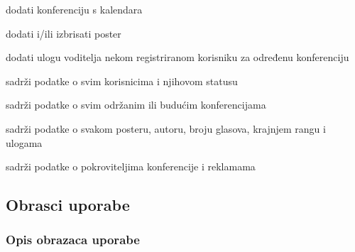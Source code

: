 \begin{packed_enum}
				\item  {}
				
				\begin{packed_enum}
					
					\item dodati konferenciju s kalendara
					\item dodati i/ili izbrisati poster
					\item dodati ulogu voditelja nekom registriranom korisniku za određenu konferenciju
					
				\end{packed_enum}

			
				\item  {}
				
				\begin{packed_enum}
					
					\item sadrži podatke o svim korisnicima i njihovom statusu
					\item sadrži podatke o svim održanim ili budućim konferencijama
					\item sadrži podatke o svakom posteru, autoru, broju glasova, krajnjem rangu i ulogama
					\item sadrži podatke o pokroviteljima konferencije i reklamama
					
				\end{packed_enum}
			\end{packed_enum}
			
			\eject 
			
			
				
			\subsection{Obrasci uporabe}
				
				\subsubsection{Opis obrazaca uporabe}
					

